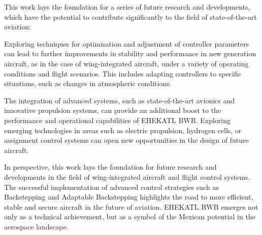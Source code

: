 This work lays the foundation for a series of future research and developments, which have the potential to contribute significantly to the field of state-of-the-art aviation:

Exploring techniques for optimisation and adjustment of controller parameters can lead to further improvements in stability and performance in new generation aircraft, as in the case of wing-integrated aircraft, under a variety of operating conditions and flight scenarios. This includes adapting controllers to specific situations, such as changes in atmospheric conditions.

The integration of advanced systems, such as state-of-the-art avionics and innovative propulsion systems, can provide an additional boost to the performance and operational capabilities of EHEKATL BWB. Exploring emerging technologies in areas such as electric propulsion, hydrogen cells, or assignment control systems can open new opportunities in the design of future aircraft.

In perspective, this work lays the foundation for future research and developments in the field of wing-integrated aircraft and flight control systems. The successful implementation of advanced control strategies such as Backstepping and Adaptable Backstepping highlights the road to more efficient, stable and secure aircraft in the future of aviation. EHEKATL BWB emerges not only as a technical achievement, but as a symbol of the Mexican potential in the aerospace landscape.




